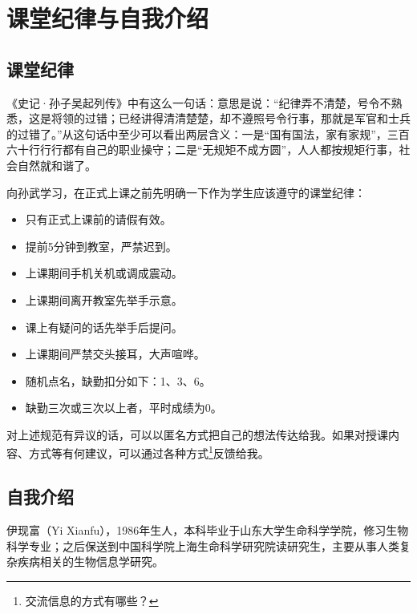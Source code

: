 \documentclass[11pt,a4paper,twoside]{book}
\begin{document}
\setcounter{chapter}{-1}
\chapter{课堂纪律与自我介绍}


\noindent
{}


\section{课堂纪律}

《史记·孙子吴起列传》中有这么一句话：意思是说：“纪律弄不清楚，号令不熟悉，这是将领的过错；已经讲得清清楚楚，却不遵照号令行事，那就是军官和士兵的过错了。”从这句话中至少可以看出两层含义：一是“国有国法，家有家规”，三百六十行行行都有自己的职业操守；二是“无规矩不成方圆”，人人都按规矩行事，社会自然就和谐了。

向孙武学习，在正式上课之前先明确一下作为学生应该遵守的课堂纪律：
\begin{itemize}
  \item 只有正式上课前的请假有效。
  \item 提前5分钟到教室，严禁迟到。
  \item 上课期间手机关机或调成震动。
  \item 上课期间离开教室先举手示意。
  \item 课上有疑问的话先举手后提问。
  \item 上课期间严禁交头接耳，大声喧哗。
  \item 随机点名，缺勤扣分如下：1、3、6。
  \item 缺勤三次或三次以上者，平时成绩为0。
\end{itemize}

对上述规范有异议的话，可以以匿名方式把自己的想法传达给我。如果对授课内容、方式等有何建议，可以通过各种方式\footnote{交流信息的方式有哪些？}反馈给我。

\section{自我介绍}
伊现富（Yi Xianfu），1986年生人，本科毕业于山东大学生命科学学院，修习生物科学专业；之后保送到中国科学院上海生命科学研究院读研究生，主要从事人类复杂疾病相关的生物信息学研究。
\end{document}
